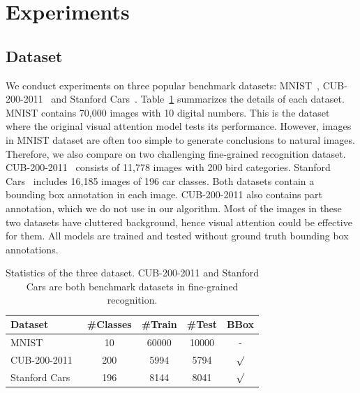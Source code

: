 \documentclass[10pt,twocolumn,letterpaper]{article}
\begin{document}
\section{Experiments}

\subsection{Dataset}

We conduct experiments on three popular benchmark datasets: MNIST~\cite{lecun1998gradient}, CUB-200-2011~\cite{wah2011caltech} and Stanford Cars~\cite{krause20133d}.
Table~\ref{tab:dataset} summarizes the details of each dataset.
MNIST contains 70,000 images with 10 digital numbers.
This is the dataset where the original visual attention model tests its performance.
However, images in MNIST dataset are often too simple to generate conclusions to natural images.
Therefore, we also compare on two challenging fine-grained recognition dataset.
CUB-200-2011~\cite{wah2011caltech} consists of 11,778 images with 200 bird categories.
Stanford Cars~\cite{krause20133d} includes 16,185 images of 196 car classes.
Both datasets contain a bounding box annotation in each image.
CUB-200-2011 also contains part annotation, which we do not use in our algorithm.
Most of the images in these two datasets have cluttered background, hence visual attention could be effective for them.
All models are trained and tested without ground truth bounding box annotations.

\begin{table}
  \centering
  \addtolength{\tabcolsep}{2.5pt}
    \begin{tabular}{l c c c c}
      \toprule[0.2 em]
      Dataset & \#Classes & \#Train & \#Test & BBox  \\
      \toprule[0.2 em]
      \midrule
      MNIST~\cite{lecun1998gradient} & 10 & 60000 & 10000 & - \\
      CUB-200-2011~\cite{wah2011caltech} & 200 & 5994 & 5794 & $\surd$ \\
      Stanford Cars~\cite{krause20133d} & 196 & 8144 & 8041 & $\surd$ \\
      \bottomrule[0.1 em]
    \end{tabular}
    \vspace{1pt}
    \caption{Statistics of the three dataset. CUB-200-2011 and Stanford Cars are both benchmark datasets in fine-grained recognition.}
    \label{tab:dataset}
\end{table}
\end{document}
